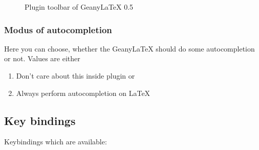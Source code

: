 \documentclass[%
paper=a4,%
fontsize=11pt,%
twoside=false,%
DIV18,
headsepline,
plainheadsepline,
footsepline,
plainfootsepline,
bibliography=totoc,%
listof=totoc,%
BCOR10mm,%
parskip=half,%
openany,%
]{scrartcl}
\begin{document}
\begin{figure}[h!]
	\caption{Plugin toolbar of Geany\LaTeX{} 0.5}
\end{figure}

\subsubsection{Modus of autocompletion}
\label{sec:modus_of_autocompletion}
Here you can choose, whether the Geany\LaTeX{} should do some
autocompletion or not. Values are either
\begin{enumerate}
	\item Don't care about this inside plugin or
	\item Always perform autocompletion on LaTeX
\end{enumerate}


\subsection{Key bindings}
Keybindings which are available:
\end{document}
